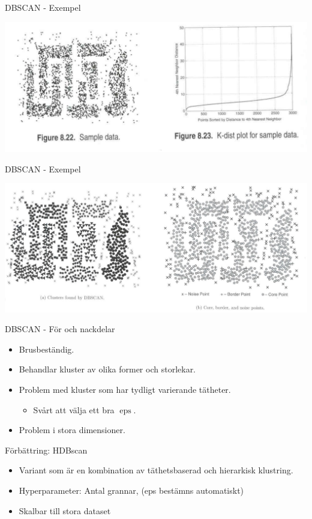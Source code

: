 \documentclass[10pt,english]{beamer}
\begin{document}
\begin{frame}{DBSCAN - Exempel}

    \includegraphics[width=\textwidth]{figs/density_cluster.png}
    
\end{frame}

\begin{frame}{DBSCAN - Exempel}
    
    \includegraphics[width=\textwidth]{figs/DBSCAN_cluster_example.png}

\end{frame}

\begin{frame}{DBSCAN - För och nackdelar}

    \begin{itemize}
        \item Brusbeständig.
        \item Behandlar kluster av olika former och storlekar.
        \item Problem med kluster som har tydligt varierande tätheter.
        \begin{itemize}
            \item Svårt att välja ett bra $\operatorname{eps}$.
        \end{itemize}
        \item Problem i stora dimensioner.
    \end{itemize}
    
    Förbättring: HDBscan
    \begin{itemize}
        \item Variant som är en kombination av täthetsbaserad och hierarkisk klustring.
        \item Hyperparameter: Antal grannar, (eps bestämns automatiskt)
        \item Skalbar till stora dataset
    \end{itemize}
    
\end{frame}
\end{document}
